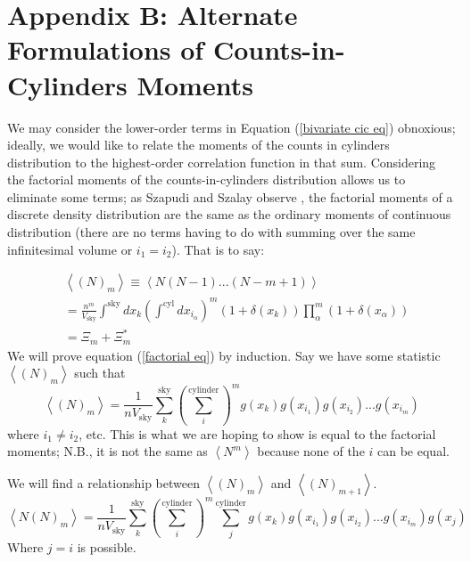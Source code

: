 \documentclass[fleqn,usenatbib]{mnras}
\begin{document}
\section*{Appendix B: Alternate Formulations of Counts-in-Cylinders Moments}
We may consider the lower-order terms in Equation (\ref{bivariate cic eq}) obnoxious; ideally, we would like to relate the moments of the counts in cylinders distribution to the highest-order correlation function in that sum. Considering the factorial moments of the counts-in-cylinders distribution allows us to eliminate some terms; as Szapudi and Szalay observe \citep{szapudi_new_1998}, the factorial moments of a discrete density distribution are the same as the ordinary moments of continuous distribution (there are no terms having to do with summing over the same infinitesimal volume or $i_1 = i_2$). That is to say:

\begin{align}
& \left<(N)_m\right> \equiv \left<N(N-1)...(N-m + 1)\right>  \\ &=
\frac{n^m}{V_{\text{sky}}}\int^{\text{sky}}dx_k\left(\int^{\text{cyl}}dx_{i_\alpha}\right)^m  (1+\delta(x_k))\prod_\alpha^m (1+\delta(x_\alpha))
\\ & = \Xi_m + \Xi^*_m \label{factorial eq}
\end{align}
We will prove equation (\ref{factorial eq}) by induction. Say we have some statistic $\left<(N)_m\right>$ such that
\begin{equation}
\left<(N)_m\right> =  \frac{1}{nV_{\text{sky}}}\sum_k^{\text{sky}}\left(\sum_i^{\text{cylinder}}\right)^m g(x_k)  g(x_{i_1})g(x_{i_2})...g(x_{i_m})
\end{equation}
where $i_1 \neq i_2$, etc. This is what we are hoping to show is equal to the factorial moments; N.B., it is not the same as $\left<N^m\right>$ because none of the $i$ can be equal.

We will find a relationship between $\left<(N)_m\right>$ and $\left<(N)_{m+1}\right>$.
\begin{equation}
\left<N(N)_m\right>  =  \frac{1}{nV_{\text{sky}}}\sum_k^{\text{sky}}\left(\sum_i^{\text{cylinder}}\right)^m\sum_j^{\text{cylinder}} g(x_k)  g(x_{i_1})g(x_{i_2})...g(x_{i_m})g(x_j)
\end{equation}
Where $j = i$ is possible.
\end{document}
